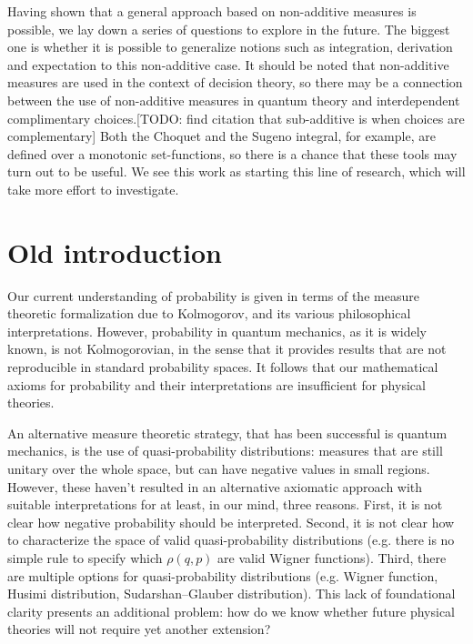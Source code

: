\documentclass[10pt,twocolumn, nofootinbib]{revtex4-2}
\begin{document}
Having shown that a general approach based on non-additive measures is possible, we lay down a series of questions to explore in the future. The biggest one is whether it is possible to generalize notions such as integration, derivation and expectation to this non-additive case.  It should be noted that non-additive measures are used in the context of decision theory, so there may be a connection between the use of non-additive measures in quantum theory and interdependent complimentary choices.[TODO: find citation that sub-additive is when choices are complementary] Both the Choquet and the Sugeno integral, for example, are defined over a monotonic set-functions, so there is a chance that these tools may turn out to be useful. We see this work as starting this line of research, which will take more effort to investigate.

\section{Old introduction}

Our current understanding of probability is given in terms of the measure theoretic formalization due to Kolmogorov, and its various philosophical interpretations. However, probability in quantum mechanics, as it is widely known, is not Kolmogorovian, in the sense that it provides results that are not reproducible in standard probability spaces. It follows that our mathematical axioms for probability and their interpretations are insufficient for physical theories.

An alternative measure theoretic strategy, that has been successful is quantum mechanics, is the use of quasi-probability distributions: measures that are still unitary over the whole space, but can have negative values in small regions. However, these haven't resulted in an alternative axiomatic approach with suitable interpretations for at least, in our mind, three reasons. First, it is not clear how negative probability should be interpreted. Second, it is not clear how to characterize the space of valid quasi-probability distributions (e.g. there is no simple rule to specify which $\rho(q,p)$ are valid Wigner functions). Third, there are multiple options for quasi-probability distributions (e.g. Wigner function, Husimi distribution, Sudarshan–Glauber distribution). This lack of foundational clarity presents an additional problem: how do we know whether future physical theories will not require yet another extension?
\end{document}
